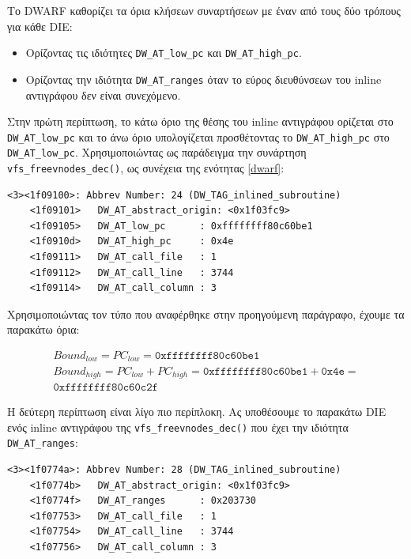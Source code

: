 \documentclass[12pt]{article}
\begin{document}
Το DWARF καθορίζει τα όρια κλήσεων συναρτήσεων με έναν από τους δύο τρόπους για
κάθε DIE:

\begin{itemize}
	\item Ορίζοντας τις ιδιότητες \lstinline{DW_AT_low_pc} και
		\lstinline{DW_AT_high_pc}.
	\item Ορίζοντας την ιδιότητα \lstinline{DW_AT_ranges} όταν το εύρος
		διευθύνσεων του inline αντιγράφου δεν είναι συνεχόμενο.
\end{itemize}

Στην πρώτη περίπτωση, το κάτω όριο της θέσης του inline αντιγράφου ορίζεται στο
\lstinline{DW_AT_low_pc} και το άνω όριο υπολογίζεται προσθέτοντας το
\lstinline{DW_AT_high_pc} στο \lstinline{DW_AT_low_pc}. Χρησιμοποιώντας ως
παράδειγμα την συνάρτηση \lstinline{vfs_freevnodes_dec()}, ως συνέχεια της
ενότητας \ref{dwarf}:

\begin{lstlisting}[caption={DIE με κάτω και άνω όρια PC}, captionpos=b]
 <3><1f09100>: Abbrev Number: 24 (DW_TAG_inlined_subroutine)
    <1f09101>   DW_AT_abstract_origin: <0x1f03fc9>
    <1f09105>   DW_AT_low_pc      : 0xffffffff80c60be1
    <1f0910d>   DW_AT_high_pc     : 0x4e
    <1f09111>   DW_AT_call_file   : 1
    <1f09112>   DW_AT_call_line   : 3744
    <1f09114>   DW_AT_call_column : 3
\end{lstlisting}

Χρησιμοποιώντας τον τύπο που αναφέρθηκε στην προηγούμενη παράγραφο, έχουμε τα
παρακάτω όρια:

\begin{equation}
\begin{split}
	Bound_{low} =  PC_{low} = \mathtt{0xffffffff80c60be1} \\
	Bound_{high} = PC_{low} + PC_{high} = \mathtt{0xffffffff80c60be1} +
	\mathtt{0x4e} = \\ \mathtt{0xffffffff80c60c2f}
\end{split}
\label{lohipc}
\end{equation}

Η δεύτερη περίπτωση είναι λίγο πιο περίπλοκη. Ας υποθέσουμε το παρακάτω DIE
ενός inline αντιγράφου της \lstinline{vfs_freevnodes_dec()} που έχει την
ιδιότητα \lstinline{DW_AT_ranges}:

\begin{lstlisting}[caption={DIE με όρια \lstinline{DW_AT_ranges}}, captionpos=b]
 <3><1f0774a>: Abbrev Number: 28 (DW_TAG_inlined_subroutine)
    <1f0774b>   DW_AT_abstract_origin: <0x1f03fc9>
    <1f0774f>   DW_AT_ranges      : 0x203730
    <1f07753>   DW_AT_call_file   : 1
    <1f07754>   DW_AT_call_line   : 3744
    <1f07756>   DW_AT_call_column : 3
\end{lstlisting}
\end{document}
